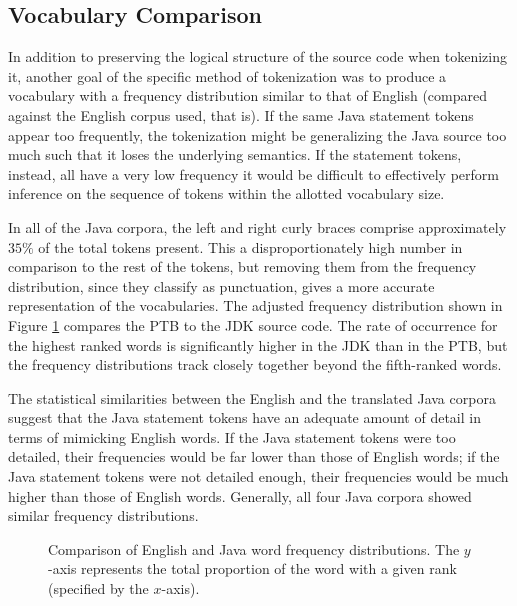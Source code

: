 \documentclass[runningheads,a4paper]{llncs}
\begin{document}
\subsection{Vocabulary Comparison}

In addition to preserving the logical structure of the source code when
tokenizing it, another goal of the specific method of tokenization was to
produce a vocabulary with a frequency distribution similar to that of
English (compared against the English corpus used, that is). If the same
Java statement tokens appear too frequently, the tokenization might be
generalizing the Java source too much such that it loses the underlying
semantics. If the statement tokens, instead, all have a very low frequency
it would be difficult to effectively perform inference on the sequence of 
tokens within the allotted vocabulary size.

In all of the Java corpora, the left and right curly braces comprise
approximately $35\%$
of the total tokens present. This a disproportionately high number in
comparison to the rest of the tokens, but removing them from the frequency
distribution, since they classify as punctuation, gives a more accurate
representation of the vocabularies. The adjusted frequency distribution
shown in Figure \ref{english-frequency} compares the PTB to the
JDK source code. The rate of occurrence for the highest
ranked words is significantly higher in the JDK than in the PTB, but
the frequency distributions track closely together beyond the fifth-ranked
words.

The statistical similarities between the English and the translated Java
corpora suggest that the Java statement tokens have an adequate amount of
detail in terms of mimicking English words. If the Java statement tokens
were too detailed, their frequencies would be far lower than those of English
words; if the Java statement tokens were not detailed enough, their
frequencies would be much higher than those of English words.
Generally, all four Java corpora showed similar frequency distributions.

\begin{figure}
\centering
{} 
\caption{Comparison of English and Java word frequency distributions.
    The $y$-axis represents the total proportion of the word with a given
    rank (specified by the $x$-axis).}
\label{english-frequency}
\end{figure}
 
\end{document}
